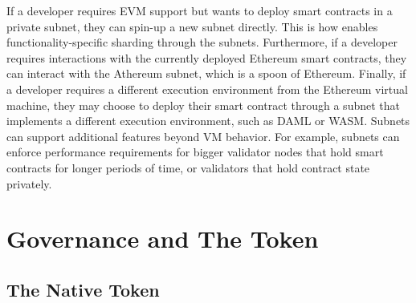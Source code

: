 \documentclass[runningheads]{llncs}
\begin{document}
If a developer requires EVM support but wants to deploy smart contracts in a private subnet, they can spin-up a new subnet directly. This is how \AVAPlatformName{} enables functionality-specific sharding through the subnets. Furthermore, if a developer requires interactions with the currently deployed Ethereum smart contracts, they can interact with the Athereum subnet, which is a spoon of Ethereum. 
Finally, if a developer requires a different execution environment from the Ethereum virtual machine, they may choose to deploy their smart contract through a subnet that implements a different execution environment, such as DAML or WASM. 
Subnets can support additional features beyond VM behavior. For example, subnets can enforce performance requirements for bigger validator nodes that hold smart contracts for longer periods of time, or validators that hold contract state privately. 

\section{Governance and The \AVATokenName{} Token}
\label{section:governance_and_token}

\subsection{The \AVATokenName{} Native Token}
\end{document}
